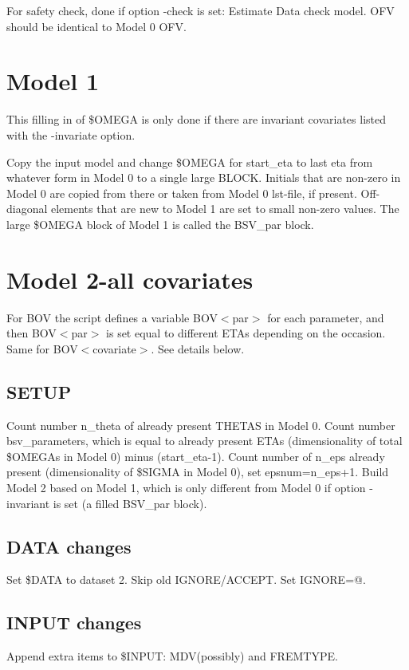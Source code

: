 For safety check, done if option -check is set: Estimate Data check model. OFV should be identical to Model 0 OFV.

\section{Model 1}
This filling in of \$OMEGA is only done if there are invariant covariates listed with the -invariate option.

Copy the input model and change \$OMEGA for start\_eta to last eta from whatever form in Model 0 to a single large BLOCK. 
Initials that are non-zero in Model 0 are copied from there or taken from Model 0 lst-file, if present. 
Off-diagonal elements that are new to Model 1 are set to small non-zero values.
The large \$OMEGA block of Model 1 is called the BSV\_par block.

\section{Model 2-all covariates}

For BOV the script defines a variable BOV$<$par$>$ for each parameter, and then BOV$<$par$>$ is set equal to different ETAs depending on the occasion. Same for BOV$<$covariate$>$. See details below. 

\subsection{SETUP}
Count number n\_theta of already present THETAS in Model 0. Count number bsv\_parameters, which is
equal to already present ETAs 
(dimensionality of total \$OMEGAs in Model 0) minus (start\_eta-1). 
Count number of n\_eps already present (dimensionality of \$SIGMA in Model 0), set epsnum=n\_eps+1.
Build Model 2 based on Model 1, which is only different from Model 0 if option -invariant is set (a filled BSV\_par block).

\subsection{DATA changes}
Set \$DATA to dataset 2. Skip old IGNORE/ACCEPT. Set IGNORE=@.

\subsection{INPUT changes}
Append extra items to \$INPUT: MDV(possibly) and FREMTYPE.

